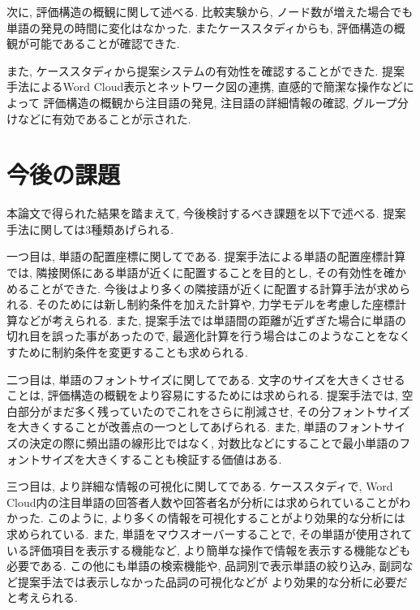 \documentclass[syuuron]{kuee}
\begin{document}
		次に, 評価構造の概観に関して述べる. 
		比較実験から, ノード数が増えた場合でも単語の発見の時間に変化はなかった. 
		またケーススタディからも, 評価構造の概観が可能であることが確認できた. 
		
		また, ケーススタディから提案システムの有効性を確認することができた. 
		提案手法によるWord Cloud表示とネットワーク図の連携, 直感的で簡潔な操作などによって
		評価構造の概観から注目語の発見, 注目語の詳細情報の確認, グループ分けなどに有効であることが示された. 		
		
	\section{今後の課題}
		本論文で得られた結果を踏まえて, 今後検討するべき課題を以下で述べる. 
		提案手法に関しては3種類あげられる. 
		
		一つ目は, 単語の配置座標に関してである. 
		提案手法による単語の配置座標計算では, 隣接関係にある単語が近くに配置することを目的とし, その有効性を確かめることができた. 
		今後はより多くの隣接語が近くに配置する計算手法が求められる. 
		そのためには新し制約条件を加えた計算や, 力学モデルを考慮した座標計算などが考えられる. 
		また, 提案手法では単語間の距離が近ずぎた場合に単語の切れ目を誤った事があったので, 
		最適化計算を行う場合はこのようなことをなくすために制約条件を変更することも求められる. 
		
		二つ目は, 単語のフォントサイズに関してである. 
		文字のサイズを大きくさせることは, 評価構造の概観をより容易にするためには求められる. 
		提案手法では, 空白部分がまだ多く残っていたのでこれをさらに削減させ, その分フォントサイズを大きくすることが改善点の一つとしてあげられる. 
		また, 単語のフォントサイズの決定の際に頻出語の線形比ではなく, 対数比などにすることで最小単語のフォントサイズを大きくすることも検証する価値はある. 
		
		三つ目は, より詳細な情報の可視化に関してである. 
		ケーススタディで, Word Cloud内の注目単語の回答者人数や回答者名が分析には求められていることがわかった. 
		このように, より多くの情報を可視化することがより効果的な分析には求められている. 
		また, 単語をマウスオーバーすることで, その単語が使用されている評価項目を表示する機能など, 
		より簡単な操作で情報を表示する機能なども必要である. 
		この他にも単語の検索機能や, 品詞別で表示単語の絞り込み, 副詞など提案手法では表示しなかった品詞の可視化などが
		より効果的な分析に必要だと考えられる. 
		
\end{document}
